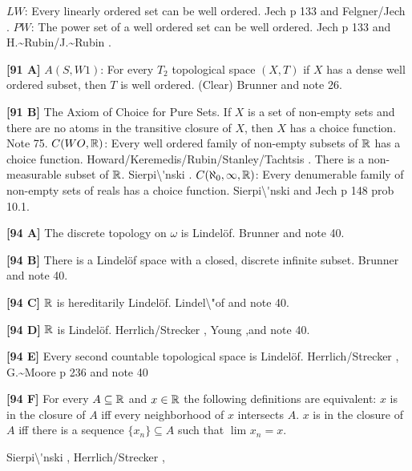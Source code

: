 \medskip
{} $LW$:  Every linearly ordered set can be well
ordered. \ac{Jech} \cite{1973b} p 133 and \ac{Felgner/Jech} \cite{1973}.
\medskip
{} $PW$:  The power set of a well ordered set can be
well ordered.  \ac{Jech} \cite{1973b} p 133 and \ac{H.~Rubin/J.~Rubin}
\cite{1985}.
\smallskip
\item{}{\bf [91 A]} $A(S,W1)$:  For every $T_2$ topological space $(X,T)$
if $X$ has  a dense well ordered subset, then $T$ is well ordered. (Clear)
\ac{Brunner} \cite{1983d} and note 26.
\smallskip
\item{}{\bf [91 B]}  The Axiom of Choice for Pure Sets.  If
$X$ is a set of non-empty sets and there are no atoms in the
transitive closure of $X$, then $X$ has a choice function.
Note 75.
\medskip
{} $C(WO,{\Bbb R})$:  Every well ordered family of
non-empty subsets of ${\Bbb R}$ has a choice function.
\ac{Howard/Keremedis/Rubin/Stanley/Tachtsis} \cite{1999}.
\medskip
{} There is a non-measurable subset of ${\Bbb R}$.
\ac{Sierpi\'nski} \cite{1918}.
\medskip
{} $C(\aleph_{0},\infty,{\Bbb R})$: Every denumerable
family of non-empty sets of reals  has a choice function. \ac{Sierpi\'nski}
\cite{1918} and \ac{Jech} \cite{1973b} p 148 prob 10.1.
\smallskip
\item{}{\bf [94 A]}  The discrete topology on $\omega$ is Lindel\"of.
\ac{Brunner} \cite{1982d} and note 40.
\smallskip
\item{}{\bf [94 B]}  There is a Lindel\"of space with a closed, discrete
infinite subset.  \ac{Brunner} \cite{1982d} and note 40.
\smallskip
\item{}{\bf [94 C]} ${\Bbb R}$ is hereditarily Lindel\"of.
\ac{Lindel\"of} \cite{1905} and note 40.
\smallskip
\item{}{\bf [94 D]} ${\Bbb R}$ is Lindel\"of.  \ac{Herrlich/Strecker}
\cite{1997}, \ac{Young} \cite{1903},and note 40.
\smallskip
\item{}{\bf [94 E]} Every second countable topological space
is Lindel\"of.  \ac{Herrlich/Strecker} \cite{1997}, \ac{G.~Moore} \cite{1982}
p 236 and note 40
\smallskip
\item{}{\bf [94 F]} For every $A\subseteq{\Bbb R}$ and $x\in{\Bbb R}$
the following definitions are equivalent:
 $x$ is in the closure of $A$ iff every neighborhood of $x$
intersects $A$.
 $x$ is in the closure of $A$ iff there is a sequence
$\{x_{n}\}\subseteq A$ such that $\lim_{}x_{n}= x$.
\item{} \ac{Sierpi\'nski} \cite{1918}, \ac{Herrlich/Strecker} \cite{1997},
